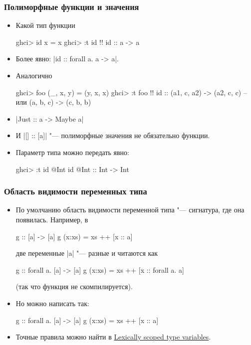 \documentclass[10pt]{beamer}
\begin{document}
\begin{frame}[fragile]
  \frametitle{Полиморфные функции и значения}
  \begin{itemize}
    \item Какой тип функции
          \begin{haskell}
            ghci> id x = x
            ghci> :t id !\pause!
            id :: a -> a
          \end{haskell}
    \item Более явно: \haskinline|id :: forall a. a -> a|.
    \item Аналогично
          \begin{haskell}
            ghci> foo (_, x, y) = (y, x, x)
            ghci> :t foo !\pause!
            id :: (a1, c, a2) -> (a2, c, c) 
            -- или (a, b, c) -> (c, b, b)
          \end{haskell}
    \item \haskinline|Just :: a -> Maybe a|
    \item И \haskinline|[] :: [a]| "--- полиморфные значения не обязательно функции.
    \item Параметр типа можно передать явно:
          \begin{haskell}
            ghci> :t id @Int
            id @Int :: Int -> Int
          \end{haskell}
  \end{itemize}
\end{frame}

\begin{frame}[fragile]
  \frametitle{Область видимости переменных типа}
  \begin{itemize}
    \item По умолчанию область видимости переменной типа "--- сигнатура, где она появилась. Например, в
          \begin{haskell}
            g :: [a] -> [a]
            g (x:xs) = xs ++ [x :: a]
          \end{haskell}
          \pause
          две переменные \haskinline|a| "--- разные и читаются как
          \begin{haskell}
            g :: forall a. [a] -> [a]
            g (x:xs) = xs ++ [x :: forall a. a]
          \end{haskell}
          \pause
          (так что функция не скомпилируется).
          \pause
    \item Но можно написать так:
          \begin{haskell}
            g :: forall a. [a] -> [a]
            g (x:xs) = xs ++ [x :: a]
          \end{haskell}
    \item Точные правила можно найти в \href{https://ghc.gitlab.haskell.org/ghc/doc/users_guide/exts/scoped_type_variables.html}{Lexically scoped type variables}.
  \end{itemize}
\end{frame}
\end{document}
